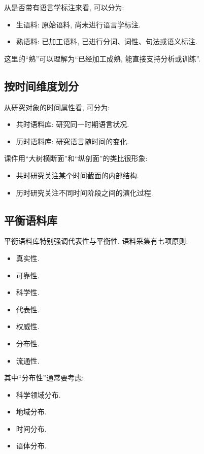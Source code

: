 从是否带有语言学标注来看, 可以分为:

\begin{itemize}
\item 生语料: 原始语料, 尚未进行语言学标注.
\item 熟语料: 已加工语料, 已进行分词、词性、句法或语义标注.
\end{itemize}

这里的“熟”可以理解为“已经加工成熟, 能直接支持分析或训练”.

\subsection{按时间维度划分}


从研究对象的时间属性看, 可分为:

\begin{itemize}
\item 共时语料库: 研究同一时期语言状况.
\item 历时语料库: 研究语言随时间的变化.
\end{itemize}

课件用“大树横断面”和“纵剖面”的类比很形象:

\begin{itemize}
\item 共时研究关注某个时间截面的内部结构.
\item 历时研究关注不同时间阶段之间的演化过程.
\end{itemize}

\subsection{平衡语料库}


平衡语料库特别强调代表性与平衡性.
语料采集有七项原则:

\begin{itemize}
\item 真实性.
\item 可靠性.
\item 科学性.
\item 代表性.
\item 权威性.
\item 分布性.
\item 流通性.
\end{itemize}

其中“分布性”通常要考虑:

\begin{itemize}
\item 科学领域分布.
\item 地域分布.
\item 时间分布.
\item 语体分布.
\end{itemize}

